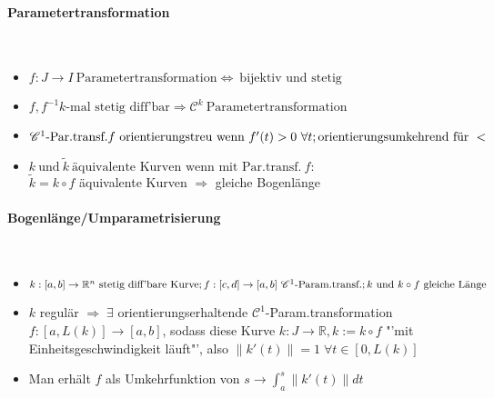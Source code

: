 \documentclass[paper=a3,paper=landscape, fontsize=9pt, DIV=30]{scrartcl}
\newcommand{\real}{{\mathbb{R}}}
\begin{document}
\begin{multicols*}{4}
  \paragraph{Parametertransformation}\hspace{0pt} \\
  \begin{itemize}
  	\item $f: J \rightarrow I \ \text{Parametertransformation} \Leftrightarrow \ \text{bijektiv und stetig}$
  	\item $f, f^{-1} k\text{-mal stetig diff'bar} \Rightarrow \mathscr{C}^k \ \text{Parametertransformation}$
  	\item $\mathscr{C}^1 \text{-Par.transf.} f \ \text{orientierungstreu wenn} \ f'(t) > 0 \ \forall t; \\ \text{orientierungsumkehrend für} \ <$
  	\item $ k \ \text{und}\ \tilde{k} \ \text{äquivalente Kurven wenn mit Par.transf.}\ f:$\\ $\tilde{k} = k \circ f$ äquivalente Kurven $\Rightarrow$ gleiche Bogenlänge
  \end{itemize}

  \paragraph{Bogenlänge/Umparametrisierung}\hspace{0pt} \\
\begin{itemize}
	\item   $k: [a,b] \rightarrow \real^n \ \text{stetig diff'bare Kurve};\\ f:[c,d] \rightarrow [a,b] \ \mathscr{C}^1\text{-Param.transf.}; k \ \text{und}\ k \circ f \ \text{gleiche Länge} $
	\item $k$ regulär $\Rightarrow\;\exists$ orientierungserhaltende $\mathscr{C}^1$-Param.transformation $f : [a,L(k)] \rightarrow [a,b]$, sodass diese Kurve $k: J \rightarrow \real, k := k \circ f$ "'mit Einheitsgeschwindigkeit läuft"', also $\lVert k'(t) \rVert = 1 \; \forall t \in [0,L(k)]$
	\item Man erhält $f$ als Umkehrfunktion von $s \rightarrow \int_{a}^{s} \lVert k'(t)\rVert dt$
\end{itemize}


\end{multicols*}
\end{document}
